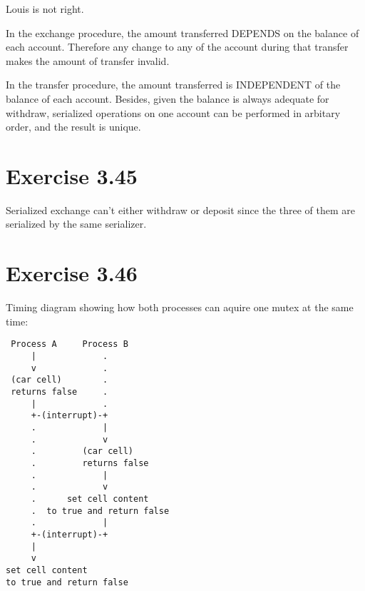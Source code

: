 \documentclass[../main.tex]{subfiles}
\begin{document}
Louis is not right.

In the exchange procedure, the amount transferred DEPENDS on the balance of each account. Therefore any change to any of the account during that transfer makes the amount of transfer invalid.

In the transfer procedure, the amount transferred is INDEPENDENT of the balance of each account. Besides, given the balance is always adequate for withdraw, serialized operations on one account can be performed in arbitary order, and the result is unique.

\section{Exercise 3.45}

Serialized exchange can't either withdraw or deposit since the three of them are serialized by the same serializer.

\section{Exercise 3.46}

Timing diagram showing how both processes can aquire one mutex at the same time:

\begin{lstlisting}
 Process A     Process B
     |             .
     v             .
 (car cell)        .
 returns false     .
     |             .
     +-(interrupt)-+
     .             |
     .             v
     .         (car cell)
     .         returns false
     .             |
     .             v
     .      set cell content
     .  to true and return false
     .             |
     +-(interrupt)-+
     |
     v
set cell content
to true and return false
\end{lstlisting}
\end{document}
